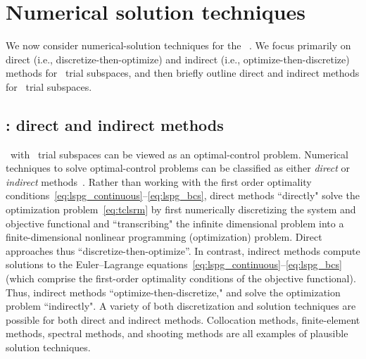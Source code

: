 \section{Numerical solution techniques}\label{sec:numerical_techniques}
We now consider numerical-solution techniques for the \methodAcronym\ \approachKwd.
We focus primarily on 
direct (i.e., discretize-then-optimize) and indirect (i.e., optimize-then-discretize) methods for \spatialAcronym\ trial subspaces, 
and then briefly outline direct and indirect methods for \spaceTimeAcronym\ trial subspaces. 
\subsection{\spatialAcronym: direct and indirect methods}
\methodAcronym\ with \spatialAcronym\ trial subspaces can be viewed as an optimal-control problem.
Numerical techniques to
solve optimal-control problems can be classified as either
\textit{direct} or \textit{indirect}
methods~\cite{conway_optimalcontrolreview}. Rather than working with the first order optimality conditions~\eqref{eq:lspg_continuous}--\eqref{eq:lspg_bcs}, direct methods ``directly" solve the optimization problem~\eqref{eq:tclsrm} by first
numerically discretizing the system and objective functional and ``transcribing"
the infinite dimensional problem into a finite-dimensional nonlinear
programming (optimization) problem. Direct approaches thus
``discretize-then-optimize''.
In contrast, indirect methods compute solutions to the Euler--Lagrange equations~\eqref{eq:lspg_continuous}--\eqref{eq:lspg_bcs} (which comprise the first-order optimality conditions of the objective functional). Thus, indirect methods ``optimize-then-discretize," and solve the optimization problem
``indirectly". A variety of both discretization and solution techniques are possible
for both direct and indirect methods. Collocation methods,
finite-element methods, spectral methods, and shooting methods are all examples of
plausible solution techniques.  

